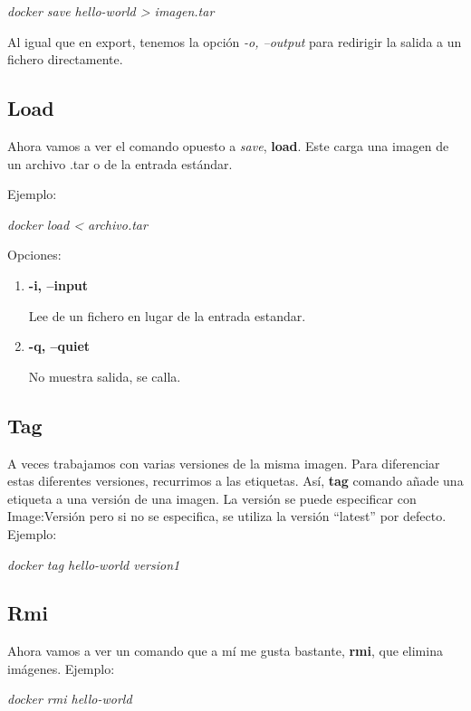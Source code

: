 \documentclass[]{article}
\begin{document}
\begin{center}
	\it
	docker save hello-world > imagen.tar
\end{center}

Al igual que en export, tenemos la opción \textit{-o, --output} para redirigir la salida a un fichero directamente.


\subsection{Load}
Ahora vamos a ver el comando opuesto a \textit{save}, \textbf{load}.
Este carga una imagen de un archivo .tar o de la entrada estándar.

Ejemplo:

\begin{center}
	\it
	docker load < archivo.tar
\end{center}

Opciones:

\begin{enumerate}
\renewcommand{\labelenumi}{$\bullet$}
\item \textbf{-i, --input}

Lee de un fichero en lugar de la entrada estandar.
\item \textbf{-q, --quiet}

No muestra salida, se calla.
\end{enumerate}


\subsection{Tag}

A veces trabajamos con varias versiones de la misma imagen.
Para diferenciar estas diferentes versiones, recurrimos a las etiquetas.
Así, \textbf{tag} comando añade una etiqueta a una versión de una imagen.
La versión se puede especificar con Image:Versión pero si no se especifica, se utiliza la versión ``latest'' por defecto.
Ejemplo:

\begin{center}
\it
docker tag hello-world version1
\end{center}

\subsection{Rmi}
Ahora vamos a ver un comando que a mí me gusta bastante, \textbf{rmi}, que elimina imágenes.
Ejemplo:

\begin{center}
	\it
	docker rmi hello-world
\end{center}
\end{document}
